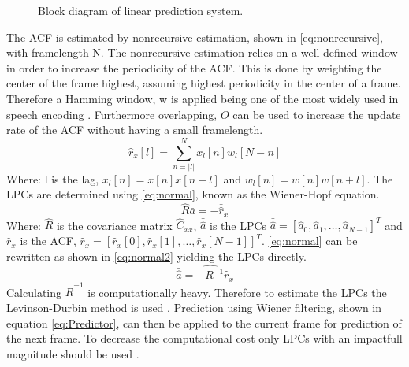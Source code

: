 \begin{figure}[H]
	\centering
	
	\caption{Block diagram of linear prediction system.}
	\label{fig:LinearPredictionOverview}
\end{figure}


The ACF is estimated by nonrecursive estimation, shown in \autoref{eq:nonrecursive}, with framelength N. The nonrecursive estimation relies on a well defined window in order to increase the periodicity of the ACF. This is done by weighting the center of the frame highest, assuming highest periodicity in the center of a frame. Therefore a Hamming window, w is applied being one of the most widely used in speech encoding \cite{LinearPrediction}. Furthermore overlapping, $O$ can be used to increase the update rate of the ACF without having a small framelength.  
\begin{equation}\label{eq:nonrecursive}
\hat{r}_x[l] = \sum^{N}_{n=\left| l\right|} x_l[n]w_l[N-n]
\end{equation}
Where: l is the lag, $x_l[n]=x[n]x[n-l]$ and $w_l[n]=w[n]w[n+l]$. The LPCs are determined using \autoref{eq:normal}, known as the Wiener-Hopf equation.
\begin{equation}\label{eq:normal}
\hat{R}  \bar{a} = -\bar{\hat{r}}_x
\end{equation}
Where: $\hat{R}$ is the covariance matrix $\hat{C}_{xx}$, $\bar{\hat{a}}$ is the LPCs $\bar{\hat{a}} = [\hat{a}_0 , \hat{a}_1, \dotsc, \hat{a}_{N-1}]^T$ and $\bar{\hat{r}}_x$ is the ACF, $\bar{\hat{r}}_x = [\hat{r}_x[0] , \hat{r}_x[1], \dotsc, \hat{r}_x[N-1]]^T$. \autoref{eq:normal} can be rewritten as shown in \autoref{eq:normal2} yielding the LPCs directly.  
 \begin{equation}\label{eq:normal2}
\bar{\hat{a}} = \hat{-R^{-1}} \bar{\hat{r}}_x
\end{equation}
Calculating $\hat{R}^{-1}$ is computationally heavy. Therefore to estimate the LPCs the Levinson-Durbin method is used \cite{LinearPrediction}. Prediction using Wiener filtering, shown in equation \ref{eq:Predictor}, can then be applied to the current frame for prediction of the next frame. To decrease the computational cost only LPCs with an impactfull magnitude should be used \cite{Speech}. 

